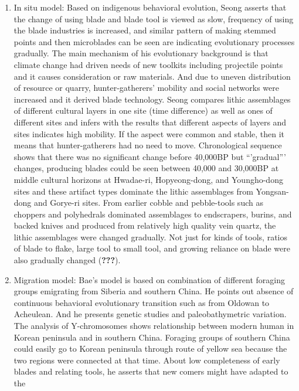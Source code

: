 \documentclass[american,man]{apa6}
\begin{document}
\begin{enumerate}
\def\labelenumi{(\arabic{enumi})}
\item
  In situ model: Based on indigenous behavioral evolution, Seong asserts
  that the change of using blade and blade tool is viewed as slow,
  frequency of using the blade industries is increased, and similar
  pattern of making stemmed points and then microblades can be seen are
  indicating evolutionary processes gradually. The main mechanism of his
  evolutionary background is that climate change had driven needs of new
  toolkits including projectile points and it causes consideration or
  raw materials. And due to uneven distribution of resource or quarry,
  hunter-gatherers' mobility and social networks were increased and it
  derived blade technology. Seong compares lithic assemblages of
  different cultural layers in one site (time difference) as well as
  ones of different sites and infers with the results that different
  aspects of layers and sites indicates high mobility. If the aspect
  were common and stable, then it means that hunter-gatherers had no
  need to move. Chronological sequence shows that there was no
  significant change before 40,000BP but \enquote{'gradual}' changes,
  producing blades could be seen between 40,000 and 30,000BP at middle
  cultural horizons at Hwadae-ri, Hopyeong-dong, and Youngho-dong sites
  and these artifact types dominate the lithic assemblages from
  Yongsan-dong and Gorye-ri sites. From earlier cobble and pebble-tools
  such as choppers and polyhedrals dominated assemblages to endscrapers,
  burins, and backed knives and produced from relatively high quality
  vein quartz, the lithic assemblages were changed gradually. Not just
  for kinds of tools, ratios of blade to flake, large tool to small
  tool, and growing reliance on blade were also gradually changed
  ({\textbf{???}}).
\item
  Migration model: Bae's model is based on combination of different
  foraging groups emigrating from Siberia and southern China. He points
  out absence of continuous behavioral evolutionary transition such as
  from Oldowan to Acheulean. And he presents genetic studies and
  paleobathymetric variation. The analysis of Y-chromosomes shows
  relationship between modern human in Korean peninsula and in southern
  China. Foraging groups of southern China could easily go to Korean
  peninsula through route of yellow sea because the two regions were
  connected at that time. About low completeness of early blades and
  relating tools, he asserts that new comers might have adapted to the

\end{enumerate}
\end{document}
